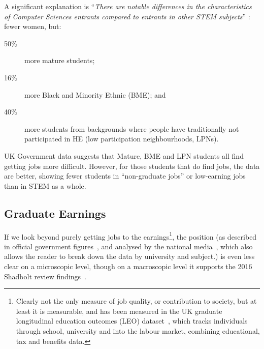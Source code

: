 \documentclass[conference]{IEEEtran}
\begin{document}
A significant explanation is ``{\emph{There are notable differences in the
characteristics of Computer Sciences entrants compared to entrants in
other STEM subjects}}'' \cite[\P2.6]{Shadbolt2016a}: fewer women, but:

\begin{description}
\item[50\% ]more mature students;
\item[16\% ]more Black and Minority Ethnic (BME); and
\item[40\% ]more students from backgrounds where people have
traditionally not participated in HE (low participation
neighbourhoods, LPNs).
\end{description}

UK Government data suggests that Mature, BME and LPN students all find
getting jobs more difficult. However, for those students that do find
jobs, the data are better, showing \cite[Figure 6]{Shadbolt2016a}
fewer students in ``non-graduate jobs'' or low-earning jobs than in
STEM as a whole.

\subsection{Graduate Earnings}
If we look beyond purely getting jobs to the earnings\footnote{Clearly
not the only measure of job quality, or contribution to society, but
at least it is measurable, and has been measured in the UK graduate
longitudinal education outcomes (LEO) dataset~\cite{DfE2017a}, which
tracks individuals through school, university and into the labour
market, combining educational, tax and benefits data.}, the position
(as described in official government figures~\cite{DfE2018d}, and
analysed by the national media~\cite{BBC2018f}, which also allows the
reader to break down the data by university and subject.) is even less
clear on a microscopic level, though on a macroscopic level it
supports the 2016 Shadbolt review findings~\cite{Shadbolt2016a}.
\end{document}

